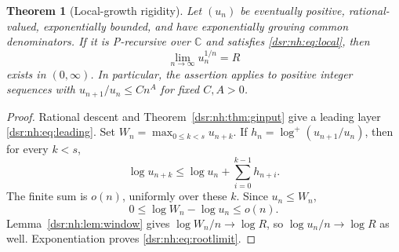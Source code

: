 \documentclass[11pt,a4paper]{article}
\numberwithin{equation}{section}
\newtheorem{theorem}{Theorem}[section]
\theoremstyle{definition}
\theoremstyle{remark}
\newcommand{\C}{\mathbb C}
\newcommand{\logp}{\log^{+}}
\theoremstyle{definition}
\theoremstyle{plain}
\begin{document}
\begin{theorem}[Local-growth rigidity]
\label{dsr:nh:thm:rigidity}
Let $(u_n)$ be eventually positive, rational-valued, exponentially bounded,
and have exponentially growing common denominators. If it is P-recursive
over $\C$ and satisfies \eqref{dsr:nh:eq:local}, then
\begin{equation}
\lim_{n\to\infty}u_n^{1/n}=R
\label{dsr:nh:eq:rootlimit}
\end{equation}
exists in $(0,\infty)$. In particular, the assertion applies to positive
integer sequences with $u_{n+1}/u_n\le Cn^A$ for fixed $C,A>0$.
\end{theorem}
\begin{proof}
Rational descent and Theorem~\ref{dsr:nh:thm:ginput} give a leading layer
\eqref{dsr:nh:eq:leading}. Set $W_n=\max_{0\le k<s}u_{n+k}$. If
$h_n=\logp(u_{n+1}/u_n)$, then for every $k<s$,
\[
\log u_{n+k}\le\log u_n+\sum_{i=0}^{k-1}h_{n+i}.
\]
The finite sum is $o(n)$, uniformly over these $k$. Since $u_n\le W_n$,
\[
0\le\log W_n-\log u_n\le o(n).
\]
Lemma~\ref{dsr:nh:lem:window} gives $\log W_n/n\to\log R$, so
$\log u_n/n\to\log R$ as well. Exponentiation proves
\eqref{dsr:nh:eq:rootlimit}.
\end{proof}
\end{document}
